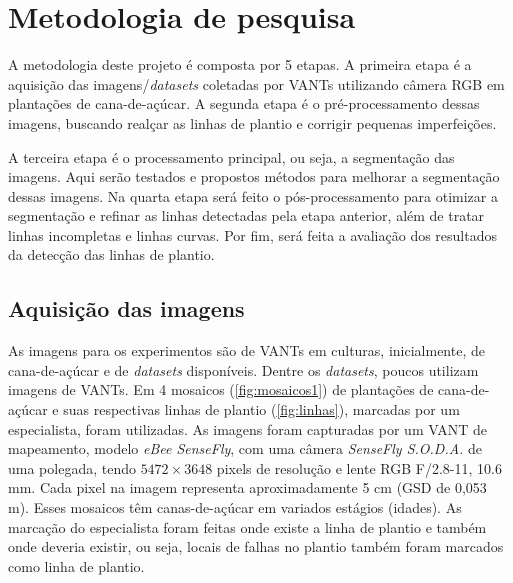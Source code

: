 \documentclass[12pt, a4paper, english, brazil]{article}
\begin{document}
\section{Metodologia de pesquisa}

A metodologia deste projeto é composta por 5 etapas. A primeira etapa é a aquisição das imagens/\textit{datasets} coletadas por VANTs utilizando câmera RGB em plantações de cana-de-açúcar. A segunda etapa é o pré-processamento dessas imagens, buscando realçar as linhas de plantio e corrigir pequenas imperfeições.

A terceira etapa é o processamento principal, ou seja, a segmentação das imagens. Aqui serão testados e propostos métodos para melhorar a segmentação dessas imagens. Na quarta etapa será feito o pós-processamento para otimizar a segmentação e refinar as linhas detectadas pela etapa anterior, além de tratar linhas incompletas e linhas curvas. Por fim, será feita a avaliação dos resultados da detecção das linhas de plantio.

\subsection{Aquisição das imagens}

As imagens para os experimentos são de VANTs em culturas, inicialmente, de cana-de-açúcar e de \textit{datasets} disponíveis. Dentre os \textit{datasets}, poucos utilizam imagens de VANTs. Em  4 mosaicos (\autoref{fig:mosaicos1}) de plantações de cana-de-açúcar e suas respectivas linhas de plantio (\autoref{fig:linhas}), marcadas por um especialista, foram utilizadas. As imagens foram capturadas por um VANT de mapeamento, modelo \textit{eBee SenseFly}, com uma câmera \textit{SenseFly S.O.D.A.} de uma polegada, tendo $5472\times3648$ pixels de resolução e lente RGB F/2.8-11, 10.6 mm. Cada pixel na imagem representa aproximadamente 5 cm (GSD de 0,053 m). Esses mosaicos têm canas-de-açúcar em variados estágios (idades). As marcação do especialista foram feitas onde existe a linha de plantio e também onde deveria existir, ou seja, locais de falhas no plantio também foram marcados como linha de plantio.
\end{document}
